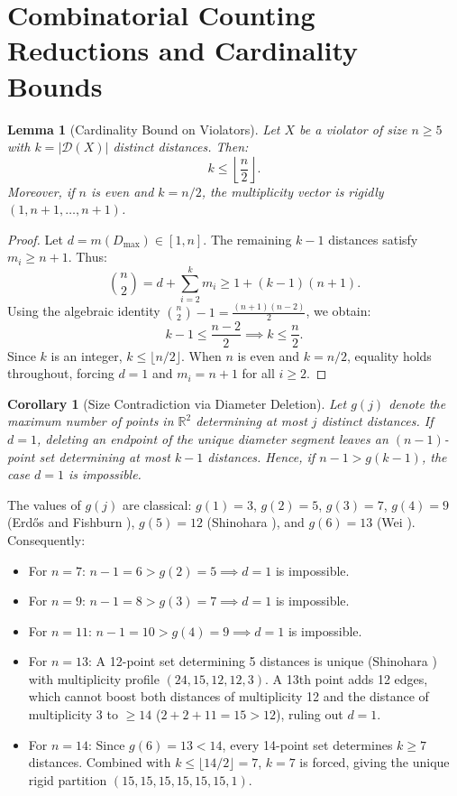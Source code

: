 \documentclass[11pt,reqno]{article}
\newtheorem{lemma}[theorem]{Lemma}
\newtheorem{corollary}[theorem]{Corollary}
\theoremstyle{definition}
\begin{document}
\section{Combinatorial Counting Reductions and Cardinality Bounds}

\begin{lemma}[Cardinality Bound on Violators]\label{lem:cardinality}
Let $X$ be a violator of size $n \ge 5$ with $k = |\mathcal{D}(X)|$ distinct distances. Then:
\[
k \le \left\lfloor \frac{n}{2} \right\rfloor.
\]
Moreover, if $n$ is even and $k = n/2$, the multiplicity vector is rigidly $(1, n+1, \dots, n+1)$.
\end{lemma}
\begin{proof}
Let $d = m(D_{\max}) \in [1, n]$. The remaining $k - 1$ distances satisfy $m_i \ge n + 1$. Thus:
\[
\binom{n}{2} = d + \sum_{i=2}^k m_i \ge 1 + (k - 1)(n + 1).
\]
Using the algebraic identity $\binom{n}{2} - 1 = \frac{(n+1)(n-2)}{2}$, we obtain:
\[
k - 1 \le \frac{n-2}{2} \implies k \le \frac{n}{2}.
\]
Since $k$ is an integer, $k \le \lfloor n/2 \rfloor$. When $n$ is even and $k = n/2$, equality holds throughout, forcing $d = 1$ and $m_i = n + 1$ for all $i \ge 2$.
\end{proof}

\begin{corollary}[Size Contradiction via Diameter Deletion]\label{cor:size_contra}
Let $g(j)$ denote the maximum number of points in $\mathbb{R}^2$ determining at most $j$ distinct distances. If $d = 1$, deleting an endpoint of the unique diameter segment leaves an $(n-1)$-point set determining at most $k - 1$ distances. Hence, if $n - 1 > g(k - 1)$, the case $d = 1$ is impossible.
\end{corollary}

The values of $g(j)$ are classical: $g(1)=3$, $g(2)=5$, $g(3)=7$, $g(4)=9$ (Erd\H{o}s and Fishburn \cite{ErFi96}), $g(5)=12$ (Shinohara \cite{Shi08}), and $g(6)=13$ (Wei \cite{Wei12}). Consequently:
\begin{itemize}
    \item For $n = 7$: $n - 1 = 6 > g(2) = 5 \implies d = 1$ is impossible.
    \item For $n = 9$: $n - 1 = 8 > g(3) = 7 \implies d = 1$ is impossible.
    \item For $n = 11$: $n - 1 = 10 > g(4) = 9 \implies d = 1$ is impossible.
    \item For $n = 13$: A 12-point set determining 5 distances is unique (Shinohara \cite{Shi08}) with multiplicity profile $(24, 15, 12, 12, 3)$. A 13th point adds 12 edges, which cannot boost both distances of multiplicity 12 and the distance of multiplicity 3 to $\ge 14$ ($2 + 2 + 11 = 15 > 12$), ruling out $d = 1$.
    \item For $n = 14$: Since $g(6) = 13 < 14$, every 14-point set determines $k \ge 7$ distances. Combined with $k \le \lfloor 14/2 \rfloor = 7$, $k = 7$ is forced, giving the unique rigid partition $(15, 15, 15, 15, 15, 15, 1)$.
\end{itemize}
\end{document}
